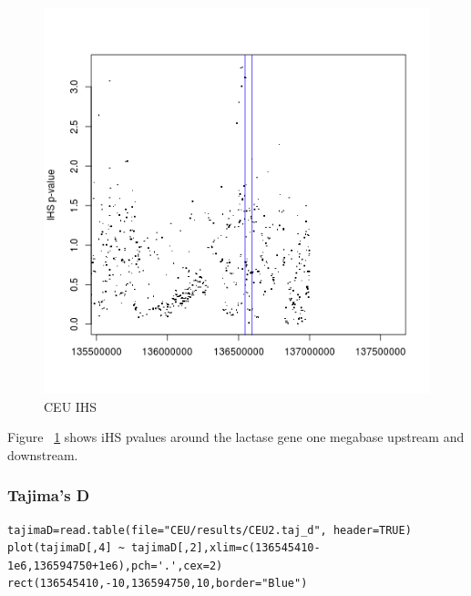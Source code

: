 \documentclass[a4paper,10pt]{article}
\begin{document}
\begin{figure}
\centering
\includegraphics{pictures/CEUihs.png}
\caption{CEU IHS}
\label{fig:b}
\end{figure}

Figure ~\ref{fig:b} shows iHS pvalues around the lactase gene one megabase upstream and downstream.

\subsubsection{Tajima's D}
\begin{verbatim}
tajimaD=read.table(file="CEU/results/CEU2.taj_d", header=TRUE)
plot(tajimaD[,4] ~ tajimaD[,2],xlim=c(136545410-1e6,136594750+1e6),pch='.',cex=2)
rect(136545410,-10,136594750,10,border="Blue") 
\end{verbatim}
\end{document}
